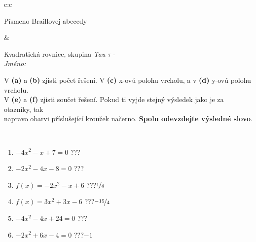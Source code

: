 \documentclass[10pt]{report}
\begin{document}
\begin{tabular}{c:c}
\begin{minipage}[c][104.5mm][t]{0.5\linewidth}
\begin{center}
\begin{minipage}{0.20\linewidth}
\begin{center}
{\small Písmeno Braillovej abecedy}
\end{center}
\end{minipage}
\end{center}
\end{minipage}
&
\begin{minipage}[c][104.5mm][t]{0.5\linewidth}
\begin{center}
\vspace{7mm}
{\huge Kvadratická rovnice, skupina \textit{Tau $\tau$} -}\\[5mm]
\textit{Jméno:}\phantom{xxxxxxxxxxxxxxxxxxxxxxxxxxxxxxxxxxxxxxxxxxxxxxxxxxxxxxxxxxxxxxxxx}\\[5mm]
\begin{minipage}{0.95\linewidth}
\begin{center}
V \textbf{(a)} a \textbf{(b)} zjisti počet řešení. V \textbf{(c)} x-ovú polohu vrcholu, a v \textbf{(d)} y-ovú polohu vrcholu.\\V \textbf{(e)} a \textbf{(f)} zjisti součet řešení. Pokud ti vyjde stejný výsledek jako je za otazníky, tak\\napravo obarvi příslušející kroužek načerno. \textbf{Spolu odevzdejte výsledné slovo}.
\end{center}
\end{minipage}
\\[1mm]
\begin{minipage}{0.79\linewidth}
\begin{center}
\begin{varwidth}{\linewidth}
\begin{enumerate}
\Large
\item $-4x^2-x+7=0$\quad \dotfill\; ???\;\dotfill {}
\item $-2x^2-4x-8=0$\quad \dotfill\; ???\;\dotfill {}
\item $f(x)=-2x^2-x+6$\quad \dotfill\; ???\;\dotfill \quad $\nicefrac{1}{4}$
\item $f(x)=3x^2+3x-6$\quad \dotfill\; ???\;\dotfill \quad $\nicefrac{-15}{4}$
\item $-4x^2-4x+24=0$\quad \dotfill\; ???\;\dotfill {}
\item $-2x^2+6x-4=0$\quad \dotfill\; ???\;\dotfill \quad $-1$
\end{enumerate}
\end{varwidth}
\end{center}
\end{minipage}
\begin{minipage}{0.20\linewidth}
\begin{center}

\end{center}
\end{minipage}
\end{center}
\end{minipage}
\end{tabular}
\end{document}

